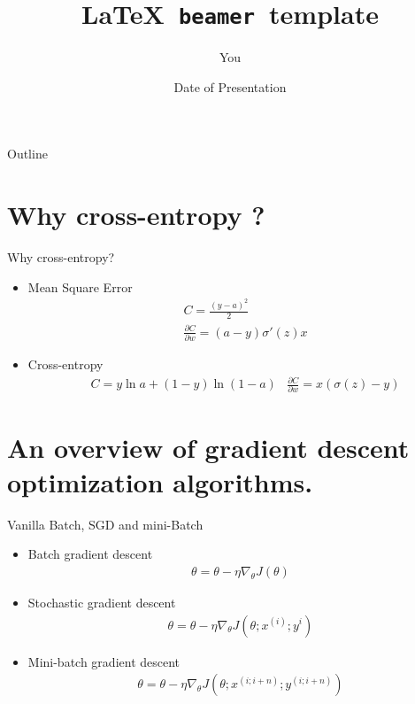 \documentclass{beamer}
\title[Your Short Title]{\LaTeX\ \texttt{beamer}\ template}
\author{You}
\institute{Where You're From}
\date{Date of Presentation}
\begin{document}
\begin{frame}
  \titlepage
\end{frame}

\begin{frame}{Outline}
  \tableofcontents
\end{frame}

\section{Why cross-entropy ?}
	\begin{frame}{Why cross-entropy?}
		\begin{itemize}
			\item{Mean Square Error}
				\begin{align*}
					&C=\frac{(y-a)^2}{2} \\
					&\frac{\partial C}{\partial w} = (a-y) \sigma'(z)x
				\end{align*}
			\item{Cross-entropy}
				\begin{align*}
					&C=y \ln a+(1-y)\ln(1-a)
					&\frac{\partial C}{\partial w}=x(\sigma(z)-y)
				\end{align*}
		\end{itemize}
	\end{frame}
\section{An overview of gradient descent optimization algorithms.}
\begin{frame}{Vanilla Batch, SGD and mini-Batch}
	\begin{itemize}
		\item{Batch gradient descent}
			\begin{align*}
				\theta=\theta - \eta \nabla_\theta J(\theta)
			\end{align*}
		\item{Stochastic gradient descent}
			\begin{align*}
				\theta=\theta - \eta \nabla_\theta J(\theta;x^{(i)};y^{i})
			\end{align*}
		\item{Mini-batch gradient descent}
			\begin{align*}
				\theta=\theta - \eta \nabla_\theta J(\theta;x^{(i;i+n)};y^{(i;i+n)})
			\end{align*}
	\end{itemize}
\end{frame}
\end{document}
